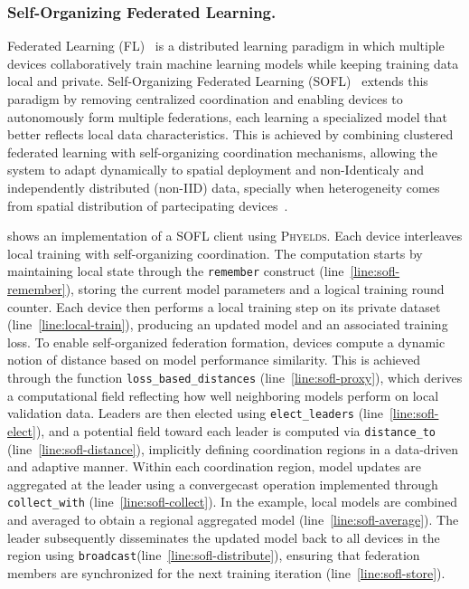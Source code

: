 \documentclass[runningheads]{llncs}
\begin{document}
\subsubsection{Self-Organizing Federated Learning.}\label{sec:sofl}
Federated Learning (FL)~\cite{DBLP:conf/aistats/McMahanMRHA17,DBLP:journals/corr/McMahanMRA16}
 is a distributed learning paradigm 
 in which multiple devices collaboratively train machine learning models 
 while keeping training data local and private.
%
Self-Organizing Federated Learning (SOFL)~\cite{DBLP:journals/lmcs/DominiAEV26,DBLP:journals/iot/DominiFAVE26}
 extends this paradigm by removing centralized coordination 
 and enabling devices to autonomously form multiple federations, 
 each learning a specialized model that better reflects local data characteristics. 
% 
This is achieved by combining clustered federated learning 
 with self-organizing coordination mechanisms, 
 allowing the system to adapt dynamically to spatial deployment and 
 non-Identicaly and independently distributed (non-IID) data,
 specially when heterogeneity comes from spatial distribution 
 of partecipating devices~\cite{DBLP:journals/jors/DominiIALV26}.

 shows an implementation of a SOFL client using \textsc{Phyelds}. 
%
Each device interleaves local training with self-organizing coordination. 
%
The computation starts by maintaining local state through the \texttt{remember} construct (line~\ref{line:sofl-remember}), 
 storing the current model parameters and a logical training round counter. 
% 
Each device then performs a local training step on its private dataset (line~\ref{line:local-train}), 
 producing an updated model and an associated training loss.
%
To enable self-organized federation formation, 
 devices compute a dynamic notion of distance based on model performance similarity. 
% 
This is achieved through the function \texttt{loss\_based\_distances} (line~\ref{line:sofl-proxy}), 
 which derives a computational field reflecting how well neighboring models perform on local validation data. 
% 
Leaders are then elected using \texttt{elect\_leaders} (line~\ref{line:sofl-elect}), 
 and a potential field toward each leader is computed via \texttt{distance\_to} (line~\ref{line:sofl-distance}), 
 implicitly defining coordination regions in a data-driven and adaptive manner.
%
Within each coordination region, 
 model updates are aggregated at the leader using a convergecast operation 
 implemented through \texttt{collect\_with} (line~\ref{line:sofl-collect}). 
% 
In the example, 
 local models are combined and averaged to obtain a regional aggregated model (line~\ref{line:sofl-average}). 
% 
The leader subsequently disseminates the updated model back to all devices 
 in the region using \texttt{broadcast}(line~\ref{line:sofl-distribute}), 
 ensuring that federation members are synchronized for the next training iteration (line~\ref{line:sofl-store}).
\end{document}
